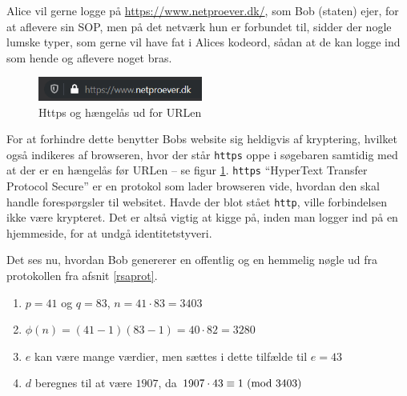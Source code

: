 \begin{eks}
    Alice vil gerne logge på \url{https://www.netproever.dk/}, som Bob (staten) ejer, for at aflevere sin SOP, men på det netværk hun er forbundet til, sidder der nogle lumske typer, som gerne vil have fat i Alices kodeord, sådan at de kan logge ind som hende og aflevere noget bras.

    \begin{figure}
        \vspace{-30pt}
        \begin{center}
            \includegraphics[width=0.48\textwidth]{img/secure.png}
        \end{center}
        \vspace{-20pt}
        \caption{Https og hængelås ud for URLen}
        \label{sikker}
        \vspace{-10pt}
    \end{figure}

    For at forhindre dette benytter Bobs website sig heldigvis af kryptering, hvilket også indikeres af browseren, hvor der står \texttt{https} oppe i søgebaren samtidig med at der er en hængelås før URLen -- se figur \ref{sikker}.
    \texttt{https} ``HyperText Transfer Protocol Secure'' er en protokol som lader browseren vide, hvordan den skal handle forespørgsler til websitet. \cite{https} Havde der blot stået \texttt{http}, ville forbindelsen ikke være krypteret. Det er altså vigtig at kigge på, inden man logger ind på en hjemmeside, for at undgå identitetstyveri.
    \par
    Det ses nu, hvordan Bob genererer en offentlig og en hemmelig nøgle ud fra protokollen fra afsnit \ref{rsaprot}.

    \begin{enumerate}[label*=(\arabic*)]%
        \item \(p = 41\) og \(q = 83\), \(n = 41 \cdot 83 = 3403\)
        \item \(\phi(n) = (41 - 1) (83 - 1) = 40 \cdot 82 = 3280\)
        \item \(e\) kan være mange værdier, men sættes i dette tilfælde til \(e = 43\)
        \item \(d\) beregnes til at være \(1907\), da \(1907 \cdot 43 \equiv 1 \ (\mathrm{mod}\ 3403)\)
    \end{enumerate}


\end{eks}
